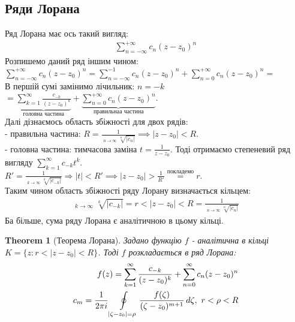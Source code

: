 \documentclass[a4paper, 10pt]{article}
\DeclareMathOperator*\uplim{\overline{lim}}
\theoremstyle{theoremdd}
\newtheorem{theorem}{Theorem}[subsection]
\theoremstyle{theoremdd}
\theoremstyle{theoremdd}
\theoremstyle{theoremdd}
\theoremstyle{theoremdd}
\theoremstyle{theoremdd}
\theoremstyle{theoremdd}
\theoremstyle{theoremdd}
\begin{document}
\subsection{Ряди Лорана}
Ряд Лорана має ось такий вигляд:
\begin{align*}
	\sum_{n=-\infty}^{+\infty} c_n(z-z_0)^n
\end{align*}
Розпишемо даний ряд іншим чином:\\
	$\displaystyle \sum_{n=-\infty}^{+\infty} c_n(z-z_0)^n = \sum_{n=-\infty}^{-1} c_n(z-z_0)^n + \sum_{n=0}^{+\infty} c_n(z-z_0)^n \boxed{=}$\\
В першій сумі замінимо лічильник: $n=-k$\\
	$\displaystyle \boxed{=} \underbrace{\sum_{k=1}^{\infty} \frac{c_{-k}}{(z-z_0)^k}}_{\textrm{головна частина}} + \underbrace{\sum_{n=0}^{+\infty} c_n(z-z_0)^n}_{\textrm{правильнаа частина}}$.\\
Далі дізнаємось область збіжності для двох рядів:\\
	- правильна частина: $R = \displaystyle\frac{1}{\displaystyle\uplim_{n \to \infty} \sqrt[n]{|c_n|}} \implies |z-z_0|<R$.\\
	- головна частина: тимчасова заміна $\displaystyle t=\frac{1}{z-z_0}$. Тоді отримаємо степеневий ряд вигляду $\displaystyle \sum_{k=1}^{\infty} c_{-k}t^k$.\\
	$R' = \displaystyle\frac{1}{\displaystyle\uplim_{k \to \infty} \sqrt[k]{|c_{-k}|}} \Rightarrow |t|<R' \implies |z-z_0|>\frac{1}{R'} \overset{\textrm{покладемо}}{=} r$.\\
Таким чином область збіжності ряду Лорану визначається кільцем:
\begin{align*}
	\uplim_{k \to \infty} \sqrt[k]{|c_{-k}|}=r<|z-z_0|<R=\frac{1}{\displaystyle\uplim_{n \to \infty} \sqrt[n]{|c_n|}}
\end{align*}
Ба більше, сума ряду Лорана є аналітичною в цьому кільці.

\begin{theorem}[Теорема Лорана]
Задано функцію $f$ - аналітична в кільці $K=\{z: r<|z-z_0|<R\}$. Тоді $f$ розкладається в ряд Лорана:
	\begin{align*}
	f(z)= \sum_{k=1}^{\infty}\frac{c_{-k}}{(z-z_0)^k}  + \sum_{n=0}^{\infty} c_n(z-z_0)^n\\
	c_m = \frac{1}{2 \pi i}\oint\displaylimits_{|\zeta-z_0|=\rho} \frac{f(\zeta)}{(\zeta-z_0)^{m+1}} \,d\zeta, \textrm{ } r<\rho<R
	\end{align*}
\end{theorem}
\end{document}
